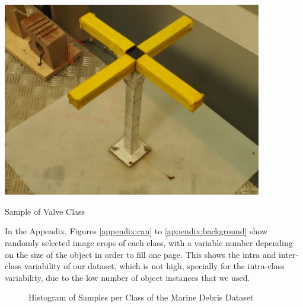 \begin{marginfigure}
    \centering
    \includegraphics[width = 0.85\textwidth]{chapters/images/dataset/valve.jpg}
    \caption{Sample of Valve Class}
    \label{md:valve}
\end{marginfigure}

In the Appendix, Figures \ref{appendix:can} to \ref{appendix:background} show randomly selected image crops of each class, with a variable number depending on the size of the object in order to fill one page. This shows the intra and inter-class variability of our dataset, which is not high, specially for the intra-class variability, due to the low number of object instances that we used.

\begin{figure}
    \centering
     \caption{Histogram of Samples per Class of the Marine Debris Dataset}
     \label{md:dataset-histogram}
\end{figure}

